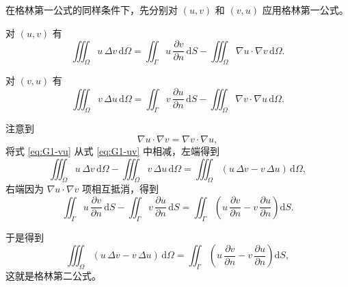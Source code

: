 \begin{definition}[格林第二公式]
在格林第一公式的同样条件下，先分别对 $(u,v)$ 和 $(v,u)$ 应用格林第一公式。

\medskip
对 $(u,v)$ 有
\begin{equation}\label{eq:G1-uv}
\iiint_{\Omega} u\,\Delta v\,\mathrm d\Omega
=
\iint_{\Gamma} u\,\frac{\partial v}{\partial n}\,\mathrm dS
-
\iiint_{\Omega} \nabla u\cdot\nabla v\,\mathrm d\Omega.
\end{equation}

对 $(v,u)$ 有
\begin{equation}\label{eq:G1-vu}
\iiint_{\Omega} v\,\Delta u\,\mathrm d\Omega
=
\iint_{\Gamma} v\,\frac{\partial u}{\partial n}\,\mathrm dS
-
\iiint_{\Omega} \nabla v\cdot\nabla u\,\mathrm d\Omega.
\end{equation}

注意到
\[
\nabla u\cdot\nabla v = \nabla v\cdot\nabla u,
\]
将式 \eqref{eq:G1-vu} 从式 \eqref{eq:G1-uv} 中相减，左端得到
\[
\iiint_{\Omega} u\,\Delta v\,\mathrm d\Omega
-\iiint_{\Omega} v\,\Delta u\,\mathrm d\Omega
=
\iiint_{\Omega} (u\,\Delta v - v\,\Delta u)\,\mathrm d\Omega,
\]
右端因为 $\nabla u\cdot\nabla v$ 项相互抵消，得到
\[
\iint_{\Gamma} u\,\frac{\partial v}{\partial n}\,\mathrm dS
-\iint_{\Gamma} v\,\frac{\partial u}{\partial n}\,\mathrm dS
=
\iint_{\Gamma}
\left(
  u\,\frac{\partial v}{\partial n}
  - v\,\frac{\partial u}{\partial n}
\right)\mathrm dS.
\]

于是得到
\begin{equation}\label{eq:Green2}
\iiint_{\Omega} (u\,\Delta v - v\,\Delta u)\,\mathrm d\Omega
=
\iint_{\Gamma}
\left(
  u\,\frac{\partial v}{\partial n}
  - v\,\frac{\partial u}{\partial n}
\right)\mathrm dS,
\end{equation}
这就是格林第二公式。
\end{definition}
